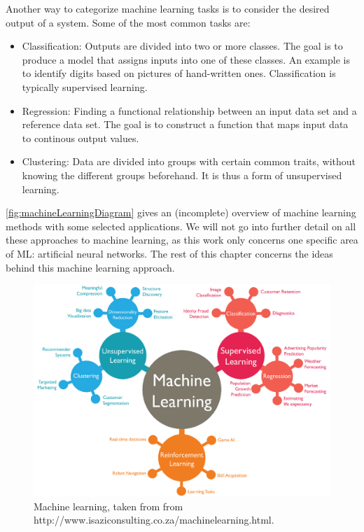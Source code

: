 \documentclass[twoside,english]{uiofysmaster}
\begin{document}
Another way to categorize machine learning tasks is to consider the desired output of a system.
Some of the most common tasks are:
\begin{itemize}
 \item Classification: Outputs are divided into two or more classes. The goal is to 
 produce a model that assigns inputs into one of these classes. An example is to identify
 digits based on pictures of hand-written ones. Classification is typically supervised learning.  
 \item Regression: Finding a functional relationship between an input data set and a reference data set. 
 The goal is to construct a function that maps input data to continous output values. 
 \item Clustering: Data are divided into groups with certain common traits, without knowing the different groups beforehand.
 It is thus a form of unsupervised learning.  
\end{itemize} 
\autoref{fig:machineLearningDiagram} gives an (incomplete) overview of machine learning methods with some selected applications.
We will not go into further detail on all these approaches to machine learning, as this work only concerns
one specific area of ML: artificial neural networks. The rest of this chapter concerns the ideas behind this machine learning
approach. 
\begin{figure}
\begin{center}
 \includegraphics[width = \linewidth]{Figures/Theory/MachineLearningDiagram.png}
 \caption{Machine learning, taken from from http://www.isaziconsulting.co.za/machinelearning.html.}
 \label{fig:machineLearningDiagram}
\end{center}
\end{figure}
\end{document}
